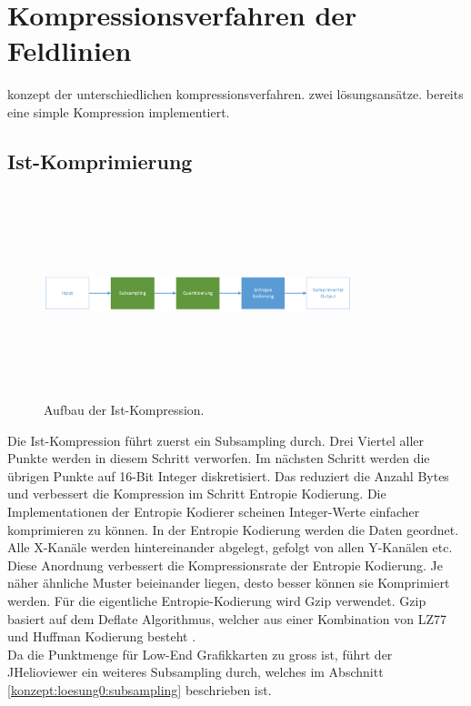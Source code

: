 \section{Kompressionsverfahren der Feldlinien} \label{konzept}
konzept der unterschiedlichen kompressionsverfahren. zwei lösungsansätze. 
bereits eine simple Kompression implementiert.

\subsection{Ist-Komprimierung} \label{konzept:ist-komprimierung}
\begin{figure}[!htbp]
	\center
	\includegraphics[width=0.8\textwidth,height=6cm,keepaspectratio]{./pictures/konzept/ist/aufbau.png}
	\caption{Aufbau der Ist-Kompression.}
	\label{konzept:ist:aufbau:diagramm}
\end{figure} 
Die Ist-Kompression führt zuerst ein Subsampling durch. Drei Viertel aller Punkte werden in diesem Schritt verworfen. Im nächsten Schritt werden die übrigen Punkte  auf 16-Bit Integer diskretisiert. Das reduziert die Anzahl Bytes und verbessert die Kompression im Schritt Entropie Kodierung. Die Implementationen der Entropie Kodierer scheinen Integer-Werte einfacher komprimieren zu können. In der Entropie Kodierung werden die Daten geordnet. Alle X-Kanäle werden hintereinander abgelegt, gefolgt von allen Y-Kanälen etc. Diese Anordnung verbessert die Kompressionsrate der Entropie Kodierung. Je näher ähnliche Muster beieinander liegen, desto besser können sie Komprimiert werden. Für die eigentliche Entropie-Kodierung wird Gzip verwendet. Gzip basiert auf dem Deflate Algorithmus, welcher aus einer Kombination von LZ77 und Huffman Kodierung besteht \cite{wiki:gzip}.\\
Da die Punktmenge für Low-End Grafikkarten zu gross ist, führt der JHelioviewer ein weiteres Subsampling durch, welches im Abschnitt \ref{konzept:loesung0:subsampling} beschrieben ist.

